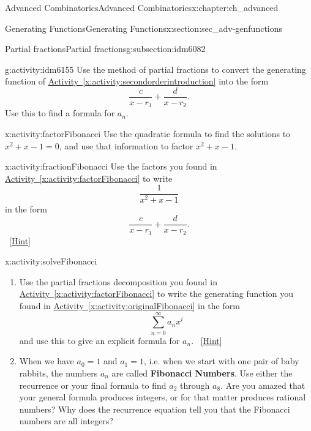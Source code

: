 \documentclass[oneside,10pt,]{book}
\newcommand{\terminology}[1]{\textbf{#1}}
\numberwithin{equation}{chapter}
\begin{document}
\begin{chapterptx}{Advanced Combinatorics}{}{Advanced Combinatorics}{}{}{x:chapter:ch_advanced}
\begin{sectionptx}{Generating Functions}{}{Generating Functions}{}{}{x:section:sec_adv-genfunctions}
\begin{subsectionptx}{Partial fractions}{}{Partial fractions}{}{}{g:subsection:idm6082}
\begin{activity}{}{g:activity:idm6155}%
Use the method of partial fractions to convert the generating function of \hyperref[x:activity:secondorderintroduction]{Activity~\ref{x:activity:secondorderintroduction}} into the form%
\begin{equation*}
\frac{c}{x-r_1} + \frac{d}{x-r_2}\text{.}
\end{equation*}
Use this to find a formula for \(a_n\).%
\end{activity}
\begin{activity}{}{x:activity:factorFibonacci}%
Use the quadratic formula to find the solutions to \(x^2+x-1=0\), and use that information to factor \(x^2+x-1\).%
\end{activity}
\begin{activity}{}{x:activity:fractionFibonacci}%
Use the factors you found in \hyperref[x:activity:factorFibonacci]{Activity~\ref{x:activity:factorFibonacci}} to write%
\begin{equation*}
\frac{1}{x^2+x-1}
\end{equation*}
in the form%
\begin{equation*}
\frac{c}{x-r_1} + \frac{d}{x-r_2}.
\end{equation*}
%
\qquad~\hfill{\tiny\hyperlink{g:hint:idm6191-back}{[Hint]}}\end{activity}
%
\begin{activity}{}{x:activity:solveFibonacci}%
\begin{enumerate}[font=\bfseries,label=(\alph*),ref=\alph*]
\item{}Use the partial fractions decomposition you found in \hyperref[x:activity:factorFibonacci]{Activity~\ref{x:activity:factorFibonacci}} to write the generating function you found in \hyperref[x:activity:originalFibonacci]{Activity~\ref{x:activity:originalFibonacci}} in the form%
\begin{equation*}
\sum_{n=0}^\infty a_nx^i
\end{equation*}
and use this to give an explicit formula for \(a_n\).%
\qquad~\hfill{\tiny\hyperlink{g:hint:idm6217-back}{[Hint]}}\item{}When we have \(a_0=1\) and \(a_1=1\), i.e. when we start with one pair of baby rabbits, the numbers \(a_n\) are called \terminology{Fibonacci Numbers}.  Use either the recurrence or your final formula to find \(a_2\) through \(a_8\).  Are you amazed that your general formula produces integers, or for that matter produces rational numbers?  Why does the recurrence equation tell you that the Fibonacci numbers are all integers?%

\end{enumerate}
\end{activity}
\end{subsectionptx}
\end{sectionptx}
\end{chapterptx}
\end{document}
